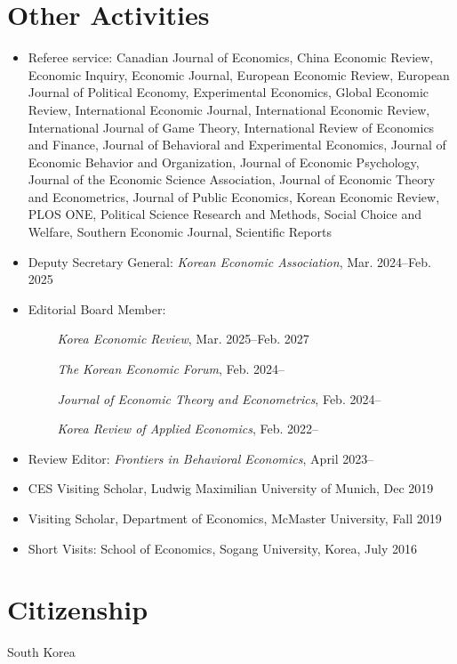 \documentclass[margin, a4paper]{res}
\begin{document}
\begin{resume}
\section{Other Activities}
\begin{itemize}[leftmargin=*]
\item Referee service: Canadian Journal of Economics, China Economic Review, Economic Inquiry, Economic Journal, European Economic Review, European Journal of Political Economy, Experimental Economics, Global Economic Review, International Economic Journal, International Economic Review, International Journal of Game Theory, International Review of Economics and Finance, Journal of Behavioral and Experimental Economics, Journal of Economic Behavior and Organization, Journal of Economic Psychology, Journal of the Economic Science Association, Journal of Economic Theory and Econometrics, Journal of Public Economics, Korean Economic Review, PLOS ONE, Political Science Research and Methods, Social Choice and Welfare, Southern Economic Journal, Scientific Reports
\item Deputy Secretary General: \emph{Korean Economic Association}, Mar. 2024--Feb. 2025
\item Editorial Board Member: 

$\qquad$ \emph{Korea Economic Review}, Mar. 2025--Feb. 2027

$\qquad$ \emph{The Korean Economic Forum}, Feb. 2024--

$\qquad$ \emph{Journal of Economic Theory and Econometrics}, Feb. 2024--

$\qquad$ \emph{Korea Review of Applied Economics}, Feb. 2022--

\item Review Editor: \emph{Frontiers in Behavioral Economics}, April 2023--
\item CES Visiting Scholar, Ludwig Maximilian University of Munich, Dec 2019
\item Visiting Scholar, Department of Economics, McMaster University, Fall 2019
\item Short Visits: School of Economics, Sogang University, Korea, July 2016
\end{itemize}

\section{Citizenship} South Korea %


\end{resume}
\end{document}
